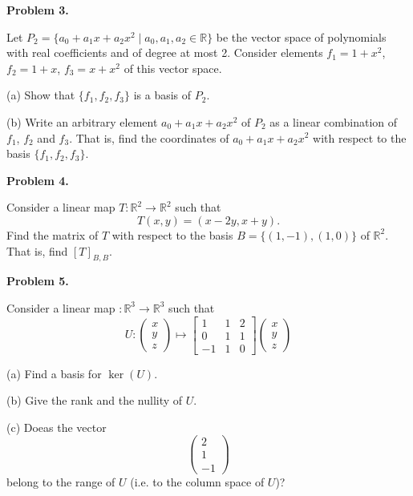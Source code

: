 \documentclass[a4paper,10pt]{article}
\def\R{\mathbb R}
\begin{document}
\vspace{20mm}\noindent
{\bf Problem 3.}

\vspace{3mm}\noindent
Let $P_2=\{ a_0 + a_1x + a_2x^2 \mid a_0,a_1,a_2\in \R\}$ be the vector space of polynomials 
with real coefficients and of degree at most 2. Consider elements $f_1=1 + x^2$, $f_2= 1+x$, $f_3= x+x^2$ 
of this vector space. 

\vspace{1mm}\noindent
(a) Show that $\{f_1,f_2,f_3\}$ is a basis of $P_2$. 

\vspace{1mm}\noindent
(b) Write an arbitrary element $a_0 + a_1x + a_2x^2$ of $P_2$ as a linear combination of $f_1$, $f_2$ and $f_3$. 
That is, find the coordinates of $a_0 + a_1x + a_2x^2$ with respect to the basis $\{f_1,f_2,f_3\}$. 


\vspace{20mm}
\newpage
\noindent
{\bf Problem 4.}

\vspace{3mm}\noindent
Consider a linear map $T:\R^2\to\R^2$ such that 
$$
T(x,y) = (x-2y, x+y). 
$$
Find the matrix of $T$ with respect to the basis $B=\{(1,-1),(1,0)\}$ of $\R^2$. That is, find $[T]_{B,B}$. 

\vspace{20mm}\noindent
{\bf Problem 5.}

\vspace{3mm}\noindent
Consider a linear map $:\R^3\to\R^3$ such that 
$$
U:\left( \begin{array}{c} x \\ y \\ z \end{array} \right) \mapsto 
\left[ \begin{array}{rcc} 1 & 1 & 2 \\ 0 & 1 & 1 \\ -1 & 1 & 0 \end{array} \right] 
\left( \begin{array}{c} x \\ y \\ z \end{array} \right)
$$

\vspace{1mm}\noindent
(a) Find a basis for $\ker(U)$. 

\vspace{1mm}\noindent
(b) Give the rank and the nullity of $U$. 

\vspace{1mm}\noindent
(c) Doeas the vector 
$$
\left( \begin{array}{r} 2 \\ 1 \\ -1 \end{array} \right)
$$
belong to the range of $U$ (i.e. to the column space of $U$)?
\end{document}
